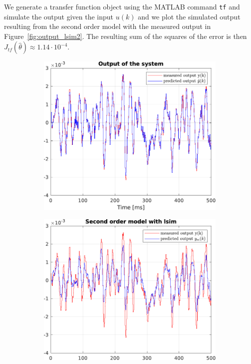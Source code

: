 \documentclass{scrartcl}
\begin{document}
We generate a transfer function object using the MATLAB command \texttt{tf} and simulate the output given the input $u(k)$ and we plot the simulated output resulting from the second order model with the measured output in Figure~\ref{fig:output_lsim2}.
The resulting sum of the squares of the error is then $ J_{tf}(\hat{\theta}) \approx 1.14 \cdot 10^{-4}$. 
\begin{figure}[h!]
	\centering
	\begin{subfigure}{.49\textwidth}
		\includegraphics[width=\textwidth]{figures/output_arx.pdf}
		\label{fig:output_arx}
	\end{subfigure}\hfill
	\begin{subfigure}{.49\textwidth}
		\includegraphics[width=\textwidth]{figures/output_lsim2.pdf}

\end{subfigure}
\end{figure}
\end{document}
